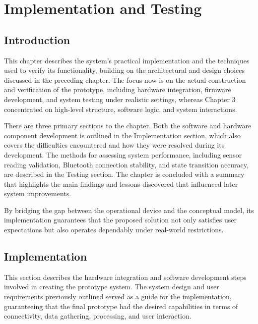 \chapter{Implementation and Testing}

\section{Introduction}
This chapter describes the system's practical implementation and the techniques used to verify its functionality, building on the architectural and design choices discussed in the preceding chapter. The focus now is on the actual construction and verification of the prototype, including hardware integration, firmware development, and system testing under realistic settings, whereas Chapter 3 concentrated on high-level structure, software logic, and system interactions.

There are three primary sections to the chapter. Both the software and hardware component development is outlined in the Implementation section, which also covers the difficulties encountered and how they were resolved during its development. The methods for assessing system performance, including sensor reading validation, Bluetooth connection stability, and state transition accuracy, are described in the Testing section. The chapter is concluded with a summary that highlights the main findings and lessons discovered that influenced later system improvements.

By bridging the gap between the operational device and the conceptual model, its implementation guarantees that the proposed solution not only satisfies user expectations but also operates dependably under real-world restrictions.

\section{Implementation}
This section describes the hardware integration and software development steps involved in creating the prototype system. The system design and user requirements previously outlined served as a guide for the implementation, guaranteeing that the final prototype had the desired capabilities in terms of connectivity, data gathering, processing, and user interaction.

